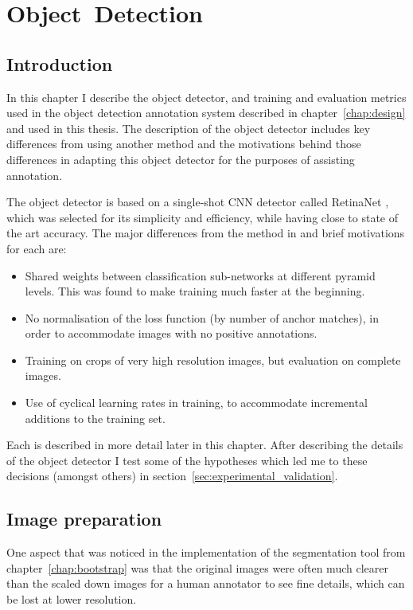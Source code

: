 \chapter{Object~Detection}
\label{chap:object_detection} 

\section{Introduction}

In this chapter I describe the object detector, and training and evaluation metrics used in the object detection annotation system described in chapter~\ref{chap:design} and used in this thesis.  The description of the object detector includes key differences from using another method and the motivations behind those differences in adapting this object detector for the purposes of assisting annotation.

The object detector is based on a single-shot \gls{CNN} detector called RetinaNet \cite{Lin2017}, which was selected for its simplicity and efficiency, while having close to state of the art accuracy. The major differences from the method in \cite{Lin2017} and brief motivations for each are:

\begin{itemize}
    \item Shared weights between classification sub-networks at different pyramid levels. This was found to make training much faster at the beginning.
    \item No normalisation of the loss function (by number of anchor matches), in order to accommodate images with no positive annotations.
    \item Training on crops of very high resolution images, but evaluation on complete images.
    \item Use of cyclical learning rates in training, to accommodate incremental additions to the training set.
\end{itemize}

Each is described in more detail later in this chapter. After describing the details of the object detector I test some of the hypotheses which led me to these decisions (amongst others) in section~\ref{sec:experimental_validation}.

\section {Image preparation}

One aspect that was noticed in the implementation of the segmentation tool from chapter~\ref{chap:bootstrap} was that the original images were often much clearer than the scaled down images for a human annotator to see fine details, which can be lost at lower resolution. 

